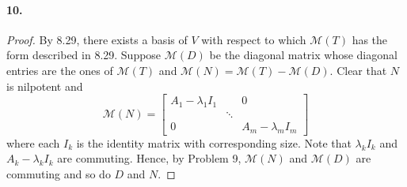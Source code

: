   \paragraph{10.}
  \begin{proof}
    By 8.29, there exists a basis of $V$ with respect to which $\mathcal{M}(T)$
    has the form described in 8.29. Suppose $\mathcal{M}(D)$ be the diagonal
    matrix whose diagonal entries are the ones of $\mathcal{M}(T)$ and 
    $\mathcal{M}(N)=\mathcal{M}(T)-\mathcal{M}(D)$. Clear that $N$ is nilpotent
    and 
    \[
      \mathcal{M}(N) = 
      \begin{bmatrix}
        A_1-\lambda_1 I_1 &        & 0 \\
                          & \ddots &   \\
        0                 &        & A_m-\lambda_m I_m
      \end{bmatrix}
    \]
    where each $I_k$ is the identity matrix with corresponding size. Note that
    $\lambda_k I_k$ and $A_k-\lambda_k I_k$ are commuting. Hence, by Problem 9,
    $\mathcal{M}(N)$ and $\mathcal{M}(D)$ are commuting and so do $D$ and $N$.
  \end{proof}
